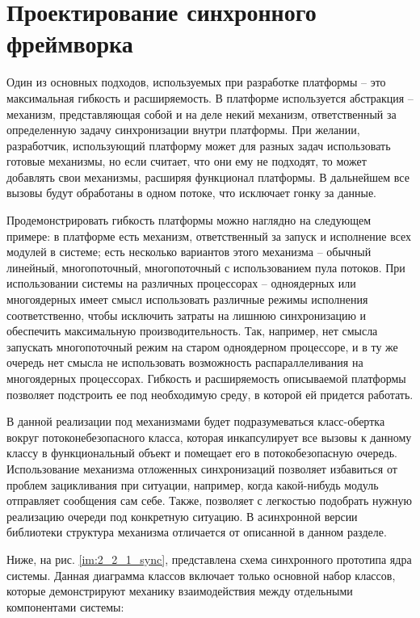 \section{Проектирование синхронного фреймворка}

Один из основных подходов, используемых при разработке платформы – это максимальная гибкость и расширяемость. В платформе используется абстракция – механизм, представляющая собой и на деле некий механизм, ответственный за определенную задачу синхронизации внутри платформы. При желании, разработчик, использующий платформу может для разных задач использовать готовые механизмы, но если считает, что они ему не подходят, то может добавлять свои механизмы, расширяя функционал платформы. В дальнейшем все вызовы будут обработаны в одном потоке, что исключает гонку за данные.

Продемонстрировать гибкость платформы можно наглядно на следующем примере: в платформе есть механизм, ответственный за запуск и исполнение всех модулей в системе; есть несколько вариантов этого механизма – обычный линейный, многопоточный, многопоточный с использованием пула потоков. При использовании системы на различных процессорах – одноядерных или многоядерных имеет смысл использовать различные режимы исполнения соответственно, чтобы исключить затраты на лишнюю синхронизацию и обеспечить максимальную производительность. Так, например, нет смысла запускать многопоточный режим на старом одноядерном процессоре, и в ту же очередь нет смысла не использовать возможность распараллеливания на многоядерных процессорах. Гибкость и расширяемость описываемой платформы позволяет подстроить ее под необходимую среду, в которой ей придется работать.

В данной реализации под механизмами будет подразумеваться класс-обертка вокруг потоконебезопасного класса, которая инкапсулирует все вызовы к данному классу в функциональный объект и помещает его в потокобезопасную очередь. Использование механизма отложенных синхронизаций позволяет избавиться от проблем зацикливания при ситуации, например, когда какой-нибудь модуль отправляет сообщения сам себе. Также, позволяет с легкостью подобрать нужную реализацию очереди под конкретную ситуацию. В асинхронной версии библиотеки структура механизма отличается от описанной в данном разделе.

Ниже, на рис. \ref{im:2_2_1_sync}, представлена схема синхронного прототипа ядра системы. Данная диаграмма классов включает только основной набор классов, которые демонстрируют механику взаимодействия между отдельными компонентами системы:

